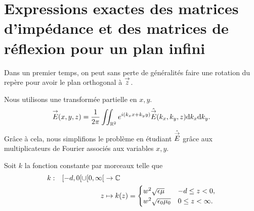 \section{Expressions exactes des matrices d'impédance et des matrices de réflexion pour un plan infini}

    Dans un premier temps, on peut sans perte de généralités faire une rotation du repère pour avoir le plan orthogonal à \(\vect{z}\).
    \begin{figure}[!h]
        \begin{center}
            \begin{tikzpicture}
                
            \end{tikzpicture}
        \end{center}
    \end{figure}
    Nous utilisons une transformée partielle en \(x, y\).
    \begin{equation*}
        \vE(x,y,z) = \frac{1}{2\pi}\iint_{\RR^2} e^{i(k_x x + k_y y)}\hat{\vE} (k_x,k_y,z) \dd{k_x}\dd{k_y.}
    \end{equation*}
    Grâce à cela, nous simplifions le problème en étudiant \( \hat{\vE}\) grâce aux multiplicateurs de Fourier associés aux variables \(x,y\). 

    Soit \(k\) la fonction constante par morceaux telle que
    \begin{equation*}
    \fonction{k}{[-d,0[\cup[0,\infty[}{\CC}
          {z}{k(z)=
          \begin{cases} 
            w^2\sqrt{\eps\mu} & -d \le z < 0,
            \\
            w^2\sqrt{\eps_0\mu_0} & 0\le z < \infty.
          \end{cases}}
    \end{equation*}

